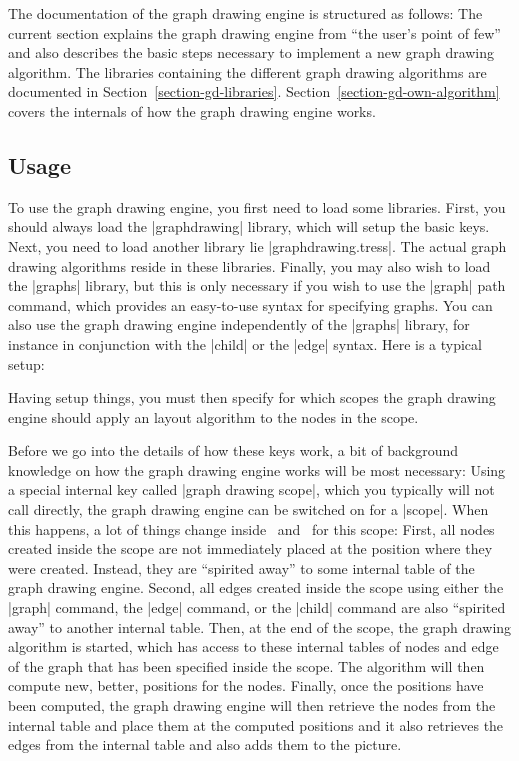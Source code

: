 The documentation of the graph drawing engine is structured as
follows: The current section explains the graph drawing engine from
``the user's point of few'' and also describes the basic steps
necessary to implement a new graph drawing algorithm. The libraries
containing the different graph drawing algorithms are documented in
Section~\ref{section-gd-libraries}. Section~\ref{section-gd-own-algorithm}
covers the internals of how the graph drawing engine works.




\subsection{Usage}

To use the graph drawing engine, you first need to load some
libraries. First, you should always load the |graphdrawing| library,
which will setup the basic keys. Next, you need to load another
library lie |graphdrawing.tress|. The actual graph drawing
algorithms reside in these libraries. Finally, you may also wish to
load the |graphs| library, but this is only necessary if you wish to
use the |graph| path command, which provides an easy-to-use syntax for
specifying graphs. You can also use the graph drawing engine
independently of the |graphs| library, for instance in conjunction
with the |child| or the |edge| syntax. Here is a typical setup:

\begin{codeexample}
\usetikzlibrary{graphs, graphdrawing, graphdrawing.trees}  
\end{codeexample}

Having setup things, you must then specify for which scopes the
graph drawing engine should apply an layout algorithm to the nodes in
the scope.

Before we go into the details of how these keys work, a bit of
background knowledge on how the graph drawing engine works will be
most necessary: Using a special internal key called
|graph drawing scope|, which you typically will not call directly,
the graph drawing engine can be switched on for a |{scope}|. When this
happens, a lot of things change inside \pgfname\ and \tikzname\ for
this scope: First, all nodes created inside the scope are not
immediately placed at the position where they were created. Instead,
they are ``spirited away'' to some internal table of the graph drawing
engine. Second, all edges created inside the scope using either the
|graph| command, the |edge| command, or the |child| command are also
``spirited away'' to another internal table. Then, at the end of the
scope, the graph drawing algorithm is started, which has access to
these internal tables of nodes and edge of the graph that has been
specified inside the scope. The algorithm will then compute new,
better, positions for the nodes. Finally, once the positions have been
computed, the graph drawing engine will then retrieve the nodes from
the internal table and place them at the computed positions and it
also retrieves the edges from the internal table and also adds them to
the picture.

